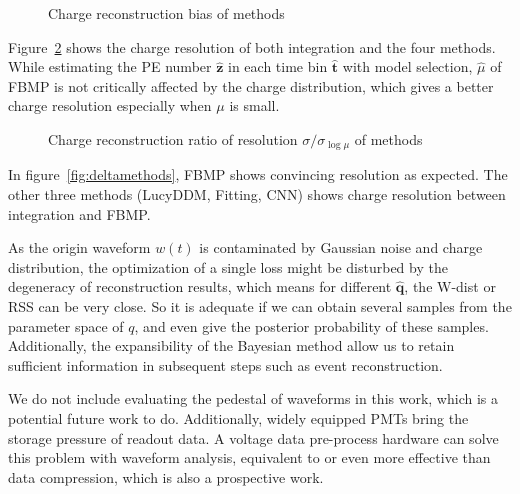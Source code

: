 \begin{figure}[H]
    \centering
    \resizebox{\textwidth}{!}{}
    \caption{\label{fig:biasmu} Charge reconstruction bias of methods}
\end{figure}

Figure~\ref{fig:deltamu} shows the charge resolution of both integration and the four methods. While estimating the PE number $\hat{\bm{z}}$ in each time bin $\hat{\bm{t}}$ with model selection, $\hat{\mu}$ of FBMP is not critically affected by the charge distribution, which gives a better charge resolution especially when $\mu$ is small. 

\begin{figure}[H]
    \centering
    \resizebox{\textwidth}{!}{}
    \caption{\label{fig:deltamu} Charge reconstruction ratio of resolution $\sigma/\sigma_{\log\mu}$ of methods}
\end{figure}

In figure~\ref{fig:deltamethods}, FBMP shows convincing resolution as expected. The other three methods (LucyDDM, Fitting, CNN) shows charge resolution between integration and FBMP. 


As the origin waveform $w(t)$ is contaminated by Gaussian noise and charge distribution, the optimization of a single loss might be disturbed by the degeneracy of reconstruction results, which means for different $\bm{\hat{q}}$, the W-dist or RSS can be very close. So it is adequate if we can obtain several samples from the parameter space of $q$, and even give the posterior probability of these samples. Additionally, the expansibility of the Bayesian method allow us to retain sufficient information in subsequent steps such as event reconstruction. 


We do not include evaluating the pedestal of waveforms in this work, which is a potential future work to do. Additionally, widely equipped PMTs bring the storage pressure of readout data. A voltage data pre-process hardware can solve this problem with waveform analysis, equivalent to or even more effective than data compression, which is also a prospective work. 

